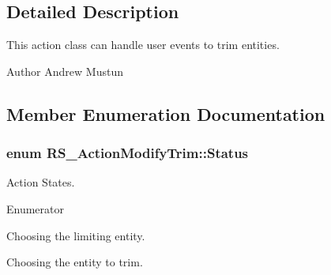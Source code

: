 \subsection{Detailed Description}
This action class can handle user events to trim entities.

\begin{DoxyAuthor}{Author}
Andrew Mustun 
\end{DoxyAuthor}


\subsection{Member Enumeration Documentation}
\hypertarget{classRS__ActionModifyTrim_a521594ffd83b9267b637fb7e36937c1e}{
\subsubsection[{Status}]{\setlength{\rightskip}{0pt plus 5cm}enum {\bf R\-S\-\_\-\-Action\-Modify\-Trim\-::\-Status}}}\label{classRS__ActionModifyTrim_a521594ffd83b9267b637fb7e36937c1e}
Action States. \begin{Desc}
\item[Enumerator]\par
\begin{description}
\item[{\em 
\hypertarget{classRS__ActionModifyTrim_a521594ffd83b9267b637fb7e36937c1ea408fa881c80d71900494fa9a60b82342}{Choose\-Limit\-Entity}\label{classRS__ActionModifyTrim_a521594ffd83b9267b637fb7e36937c1ea408fa881c80d71900494fa9a60b82342}
}]Choosing the limiting entity. \item[{\em 
\hypertarget{classRS__ActionModifyTrim_a521594ffd83b9267b637fb7e36937c1ea9e6134a551f22c5c52c4d6e5464801f7}{Choose\-Trim\-Entity}\label{classRS__ActionModifyTrim_a521594ffd83b9267b637fb7e36937c1ea9e6134a551f22c5c52c4d6e5464801f7}
}]Choosing the entity to trim. \end{description}
\end{Desc}


